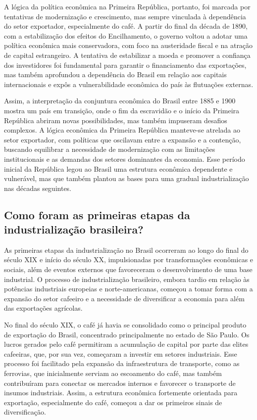 \documentclass[a4paper,12pt]{article}[abntex2]
\begin{document}
A lógica da política econômica na Primeira República, portanto, foi marcada por tentativas de modernização e crescimento, mas sempre vinculada à dependência do setor exportador, especialmente do café. A partir do final da década de 1890, com a estabilização dos efeitos do Encilhamento, o governo voltou a adotar uma política econômica mais conservadora, com foco na austeridade fiscal e na atração de capital estrangeiro. A tentativa de estabilizar a moeda e promover a confiança dos investidores foi fundamental para garantir o financiamento das exportações, mas também aprofundou a dependência do Brasil em relação aos capitais internacionais e expôs a vulnerabilidade econômica do país às flutuações externas.

Assim, a interpretação da conjuntura econômica do Brasil entre 1885 e 1900 mostra um país em transição, onde o fim da escravidão e o início da Primeira República abriram novas possibilidades, mas também impuseram desafios complexos. A lógica econômica da Primeira República manteve-se atrelada ao setor exportador, com políticas que oscilavam entre a expansão e a contenção, buscando equilibrar a necessidade de modernização com as limitações institucionais e as demandas dos setores dominantes da economia. Esse período inicial da República legou ao Brasil uma estrutura econômica dependente e vulnerável, mas que também plantou as bases para uma gradual industrialização nas décadas seguintes.

\subsection{\textbf{Como foram as primeiras etapas da industrialização brasileira?}}

As primeiras etapas da industrialização no Brasil ocorreram ao longo do final do século XIX e início do século XX, impulsionadas por transformações econômicas e sociais, além de eventos externos que favoreceram o desenvolvimento de uma base industrial. O processo de industrialização brasileiro, embora tardio em relação às potências industriais europeias e norte-americanas, começou a tomar forma com a expansão do setor cafeeiro e a necessidade de diversificar a economia para além das exportações agrícolas.

No final do século XIX, o café já havia se consolidado como o principal produto de exportação do Brasil, concentrado principalmente no estado de São Paulo. Os lucros gerados pelo café permitiram a acumulação de capital por parte das elites cafeeiras, que, por sua vez, começaram a investir em setores industriais. Esse processo foi facilitado pela expansão da infraestrutura de transporte, como as ferrovias, que inicialmente serviam ao escoamento do café, mas também contribuíram para conectar os mercados internos e favorecer o transporte de insumos industriais. Assim, a estrutura econômica fortemente orientada para exportação, especialmente do café, começou a dar os primeiros sinais de diversificação.
\end{document}
